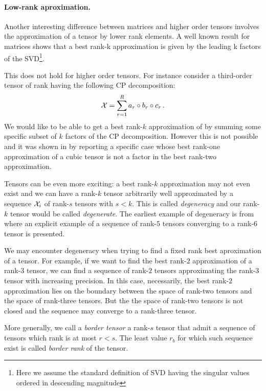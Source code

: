 \paragraph{Low-rank aproximation.}
Another interesting difference between matrices and higher order tensors involves the approximation of a tensor by lower rank elements.
A well known result for matrices \cite{SVDbestapprox} shows that a best rank-k approximation is given by the leading k factors of the SVD\footnote{Here we assume the standard definition of SVD having the singular values ordered in descending magnitude}.

This does not hold for higher order tensors. For instance consider a third-order tensor of rank \R having the following CP decomposition:
\begin{equation*}
  \mathcal{X} = \sum_{r=1}^R a_r \circ b_r \circ c_r\, .
\end{equation*}
We would like to be able to get a best rank-$k$ approximation of \X by summing some specific subset of $k$ factors of the CP decomposition. However this is not possible and it was shown in \cite{kolda2001orthogonal} by reporting a specific case whose best rank-one approximation of a cubic tensor is not a factor in the best rank-two approximation.

Tensors can be even more exciting: a best rank-$k$ approximation may not even exist and we can have a rank-$k$ tensor \X arbitrarily well approximated by a sequence ${\mathcal{X}_i}$ of rank-$s$ tensors with $s < k$. This is called \emph{degeneracy} and our rank-$k$ tensor would be called \emph{degenerate}.
The earliest example of degeneracy is from \cite{bini1980approximate} where an explicit example of a sequence of rank-$5$ tensors converging to a rank-$6$ tensor is presented.

We may encounter degeneracy when trying to find a fixed rank best aproximation of a tensor. For example, if we want to find the best rank-$2$ approximation of a rank-$3$ tensor, we can find a sequence of rank-$2$ tensors approximating the rank-$3$ tensor with increasing precision. In this case, necessarily, the best rank-$2$ approximation lies on the boundary between the space of rank-two tensors and the space of rank-three tensors. But the the space of rank-two tensors is not closed and the sequence may converge to a rank-three tensor.

More generally, we call a \emph{border tensor} a rank-$s$ tensor that admit a sequence of tensors which rank is at most $r < s$. The least value $r_b$ for which such sequence exist is called \emph{border rank} of the tensor.

